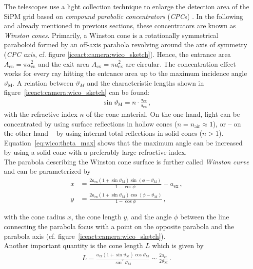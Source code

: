 The \iceact telescopes use a light collection technique to enlarge the detection area of the SiPM grid based on \textit{compound parabolic concentrators} (\textit{CPC}s) \cite{wico:book}. In the following and  already mentioned in previous sections, these concentrators are known as \textit{Winston cones}. 
Primarily, a Winston cone is a rotationally symmetrical paraboloid formed by an off-axis parabola revolving around the axis of symmetry (\textit{CPC axis}, cf. figure \ref{iceact:camera:wico_sketch}). Hence, the entrance area $A_\text{en}=\pi a_\text{en}^2$ and the exit area $A_\text{ex}=\pi a_\text{ex}^2$ are circular. The concentration effect works for every ray hitting the entrance area up to the maximum incidence angle $\vartheta_\text{M}$. A relation between $\vartheta_M$ and the characteristic lengths shown in figure~\ref{iceact:camera:wico_sketch} can be found: \cite{wico:book,iceact:camera}
\begin{align}
	\sin\vartheta_\text{M} = n\cdot\frac{a_\text{ex}}{a_\text{en}}\,,
	\label{eq:wico:theta_max}
\end{align}
with the refractive index $n$ of the cone material. On the one hand, light can be concentrated by using surface reflections in hollow cones ($n=n_\text{air}\approx 1$), or -- on the other hand -- by using internal total reflections in solid cones ($n>1$). Equation~\eqref{eq:wico:theta_max} shows that the maximum angle can be increased by using a solid cone with a preferably large refractive index.\\
\newpage
The parabola describing the Winston cone surface is further called \textit{Winston curve} and can be parameterized by \cite{wico:book,iceact:camera}
\begin{subequations}
	\label{eq:wico:param}
	\begin{align}
	x &= \frac{2a_\text{ex}(1+\sin\vartheta_\text{M})\sin(\phi-\vartheta_\text{M})}{1-\cos\phi}-a_\text{ex}\,,\\
	y &= \frac{2a_\text{ex}(1+\sin\vartheta_\text{M})\cos(\phi-\vartheta_\text{M})}{1-\cos\phi}\,,
	\end{align}
\end{subequations}

with the cone radius $x$, the cone length $y$, and the angle $\phi$ between the line connecting the parabola focus with a point on the opposite parabola and the parabola axis (cf. figure~\ref{iceact:camera:wico_sketch}).\\

Another important quantity is the cone length $L$ which is given by \cite{wico:book,iceact:camera}
\begin{align}
	L = \frac{a_\text{ex}(1+\sin\vartheta_\text{M})\cos\vartheta_\text{M}}{\sin^2\vartheta_\text{M}}\sim\frac{2a_\text{en}}{2\vartheta_\text{M}}\,.
\end{align}

